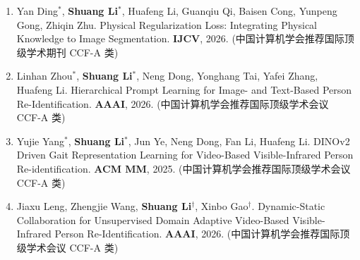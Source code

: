 \documentclass{resume}
\begin{document}
\begin{enumerate}[itemsep=1.8mm]
\item Yan Ding$^*$, \textbf{Shuang Li$^*$}, Huafeng Li, Guanqiu Qi, Baisen Cong, Yunpeng Gong, Zhiqin Zhu. Physical Regularization Loss: Integrating Physical Knowledge to Image Segmentation. {\textbf{IJCV}}, 2026. (中国计算机学会推荐国际顶级学术期刊 CCF-A 类)

\item Linhan Zhou$^*$, \textbf{Shuang Li$^*$}, Neng Dong, Yonghang Tai, Yafei Zhang, Huafeng Li. Hierarchical Prompt Learning for Image- and Text-Based Person Re-Identification. {\textbf{AAAI}}, 2026. (中国计算机学会推荐国际顶级学术会议 CCF-A 类)


\item Yujie Yang$^*$, \textbf{Shuang Li$^*$}, Jun Ye, Neng Dong, Fan Li, Huafeng Li. DINOv2 Driven Gait Representation Learning for Video-Based Visible-Infrared Person Re-identification. {\textbf{ACM MM}}, 2025. (中国计算机学会推荐国际顶级学术会议 CCF-A 类)


\item Jiaxu Leng, Zhengjie Wang, \textbf{Shuang Li$^\dagger$}, Xinbo Gao$^\dagger$. Dynamic-Static Collaboration for Unsupervised Domain Adaptive Video-Based Visible-Infrared Person Re-Identification. {\textbf{AAAI}}, 2026. (中国计算机学会推荐国际顶级学术会议 CCF-A 类)






\end{enumerate}
\vspace{1mm}
\end{document}
